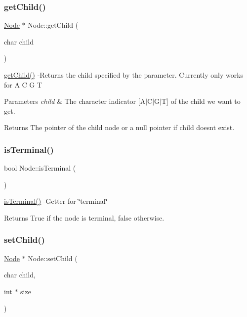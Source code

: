 \subsubsection{\texorpdfstring{get\+Child()}{getChild()}}
{\footnotesize\ttfamily \hyperlink{class_node}{Node} $\ast$ Node\+::get\+Child (\begin{DoxyParamCaption}\item[{char}]{child }\end{DoxyParamCaption})}

\hyperlink{class_node_a7d2c9441ae9f243e06d9f081bada8bad}{get\+Child()} -\/\+Returns the child specified by the parameter. Currently only works for A C G T 
\begin{DoxyParams}{Parameters}
{\em child} & The character indicator \mbox{[}A$\vert$\+C$\vert$\+G$\vert$T\mbox{]} of the child we want to get. \\
\hline
\end{DoxyParams}
\begin{DoxyReturn}{Returns}
The pointer of the child node or a null pointer if child doesn\textquotesingle{}t exist. 
\end{DoxyReturn}
\mbox{\label{class_node_a8cdae92d062555a32b908bfeae6149da}} 
\subsubsection{\texorpdfstring{is\+Terminal()}{isTerminal()}}
{\footnotesize\ttfamily bool Node\+::is\+Terminal (\begin{DoxyParamCaption}{ }\end{DoxyParamCaption})}

\hyperlink{class_node_a8cdae92d062555a32b908bfeae6149da}{is\+Terminal()} -\/\+Getter for \char`\"{}terminal\char`\"{} \begin{DoxyReturn}{Returns}
True if the node is terminal, false otherwise. 
\end{DoxyReturn}
\mbox{\label{class_node_aeb419eb3d59dba25f792546a226643bc}} 
\subsubsection{\texorpdfstring{set\+Child()}{setChild()}}
{\footnotesize\ttfamily \hyperlink{class_node}{Node} $\ast$ Node\+::set\+Child (\begin{DoxyParamCaption}\item[{char}]{child,  }\item[{int $\ast$}]{size }\end{DoxyParamCaption})}

